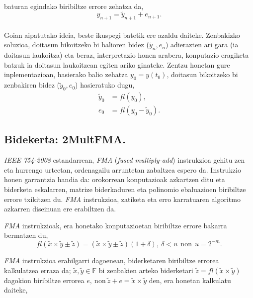 \paragraph*{}baturan egindako  biribiltze errore zehatza da,
\begin{equation}
y_{n+1}=\tilde {y}_{n+1}+e_{n+1}. 
\end{equation}

\paragraph*{}Goian aipatutako ideia,  beste ikuspegi batetik ere azaldu daiteke. Zenbakizko soluzioa, doitasun bikoitzeko bi balioren bidez ($\tilde{y}_n,e_n$)  adierazten ari gara (ia doitasun laukoitza) eta beraz, interpretazio honen arabera, konputazio eragiketa batzuk ia doitasun laukoitzean egiten ariko ginateke. Zentzu honetan gure inplementazioan, hasierako balio zehatza $y_0=y(t_0)$, doitasun bikoitzeko bi zenbakiren bidez ($\tilde{y}_0, e_0$) hasieratuko dugu,
\begin{align*}
\tilde{y}_0 &=fl(y_0) ,\\
e_0 &=fl(y_0-\tilde{y}_0).
\end{align*}

\subsection*{Bidekerta: 2MultFMA.}

\emph{IEEE 754-2008} estandarrean, \emph{FMA} (\emph{fused multiply-add}) instrukzioa gehitu zen eta hurrengo urteetan, ordenagailu arruntetan zabaltzea espero da. Instrukzio honen garrantzia handia da: orokorrean konputazioak azkartzen ditu eta biderketa eskalarren, matrize biderkaduren eta polinomio ebaluazioen biribiltze errore txikitzen du. \emph{FMA} instrukzioa, zatiketa eta erro karratuaren algoritmo azkarren diseinuan ere erabiltzen da.

\emph{FMA} instrukzioak, era honetako konputazioetan biribiltze errore bakarra bermatzen du,
\begin{equation*}
fl(\tilde x \times \tilde y \pm \tilde z)= (\tilde x \times \tilde y\pm \tilde z) (1+\delta), \ \delta<u \ \ \text{non} \ \ u=2^{-m}.
\end{equation*}
 

\emph{FMA}  instrukzioa erabilgarri dagoenean, biderketaren biribiltze errorea kalkulatzea erraza da; $\tilde x,\tilde y \in \mathbb{F}$ bi zenbakien arteko biderketari $\tilde z= fl(\tilde x \times \tilde y)$ dagokion biribiltze errorea $e, \ \text{non} \  \tilde{z}+ e=\tilde x \times \tilde y$ den, era honetan kalkulatu daiteke,

